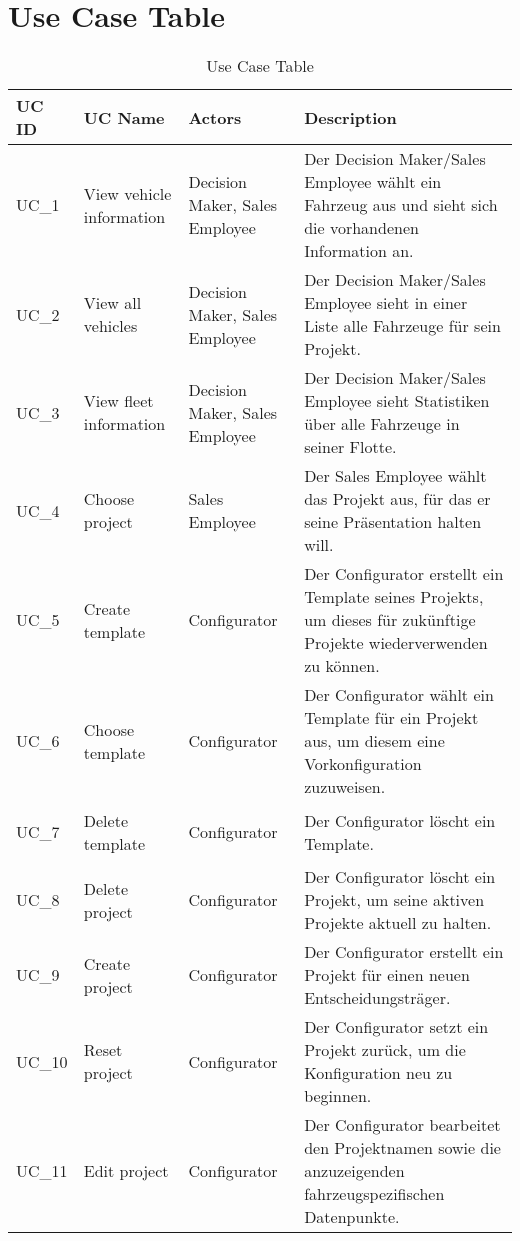\section{Use Case Table}
\sffamily
\begin{footnotesize}
  \renewcommand{\arraystretch}{1.4}
  \begin{longtable}[i i i L]{ p{} p{} p{} p{} }
    \caption                       %
        {Use Case Table} %
        \\
    \toprule
    \textbf{UC ID} & \textbf{UC Name} & \textbf{Actors}  & \textbf{Description}\\
    \midrule
    \hypertarget{Ref:UC1}{UC\_1} & View vehicle information & Decision Maker, Sales Employee & Der Decision Maker/Sales Employee wählt ein Fahrzeug aus und sieht sich die vorhandenen Information an. \\
    \hypertarget{Ref:UC2}{UC\_2} & View all vehicles & Decision Maker, Sales Employee & Der Decision Maker/Sales Employee sieht in einer Liste alle Fahrzeuge für sein Projekt. \\
    \hypertarget{Ref:UC3}{UC\_3}  & View fleet information & Decision Maker, Sales Employee & Der Decision Maker/Sales Employee sieht Statistiken über alle Fahrzeuge in seiner Flotte. \\
    \hypertarget{Ref:UC4}{UC\_4}  & Choose project & Sales Employee & Der Sales Employee wählt das Projekt aus, für das er seine Präsentation halten will. \\
    \hypertarget{Ref:UC5}{UC\_5}  & Create template & Configurator & Der Configurator erstellt ein Template seines Projekts, um dieses für zukünftige Projekte wiederverwenden zu können. \\
    \hypertarget{Ref:UC6}{UC\_6} & Choose template & Configurator & Der Configurator wählt ein Template für ein Projekt aus, um diesem eine Vorkonfiguration zuzuweisen. \\
    \hypertarget{Ref:UC7}{UC\_7} & Delete template & Configurator & Der Configurator löscht ein Template. \\
    \hypertarget{Ref:UC8}{UC\_8} & Delete project & Configurator & Der Configurator löscht ein Projekt, um seine aktiven Projekte aktuell zu halten. \\
    \hypertarget{Ref:UC9}{UC\_9} & Create project & Configurator & Der Configurator erstellt ein Projekt für einen neuen Entscheidungsträger. \\
    \hypertarget{Ref:U10}{UC\_10} & Reset project & Configurator & Der Configurator setzt ein Projekt zurück, um die Konfiguration neu zu beginnen. \\
    \hypertarget{Ref:UC11}{UC\_11} & Edit project & Configurator & Der Configurator bearbeitet den Projektnamen sowie die anzuzeigenden fahrzeugspezifischen Datenpunkte. \\
    \bottomrule
  \end{longtable}
\end{footnotesize}
\rmfamily

